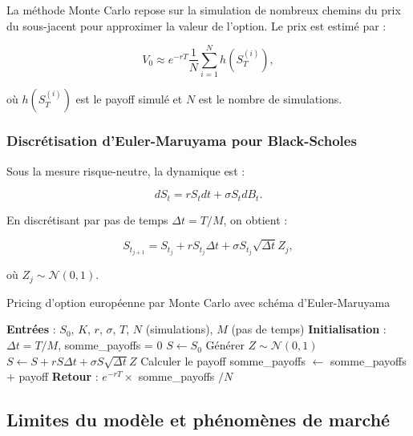 La méthode Monte Carlo repose sur la simulation de nombreux chemins du prix du sous-jacent pour approximer la valeur de l'option. Le prix est estimé par :

\begin{equation}
	V_0 \approx e^{-rT} \frac{1}{N} \sum_{i=1}^{N} h(S_T^{(i)}),
\end{equation}

où $h(S_T^{(i)})$ est le payoff simulé et $N$ est le nombre de simulations.

\subsubsection{Discrétisation d'Euler-Maruyama pour Black-Scholes}

Sous la mesure risque-neutre, la dynamique est :

\begin{equation}
	dS_t = rS_t dt + \sigma S_t dB_t.
\end{equation}

En discrétisant par pas de temps $\Delta t = T/M$, on obtient :

\begin{equation}
	S_{t_{j+1}} = S_{t_j} + rS_{t_j}\Delta t + \sigma S_{t_j}\sqrt{\Delta t} Z_j,
\end{equation}

où $Z_j \sim \mathcal{N}(0,1)$.

\begin{algorithm}[H]
	\caption{Pricing d'option européenne par Monte Carlo avec schéma d'Euler-Maruyama}
	\begin{algorithmic}[1]
		\State \textbf{Entrées} : $S_0$, $K$, $r$, $\sigma$, $T$, $N$ (simulations), $M$ (pas de temps)
		\State \textbf{Initialisation} : $\Delta t = T/M$, somme\_payoffs = 0
		\State $S \gets S_0$
		\State Générer $Z \sim \mathcal{N}(0,1)$
		\State $S \gets S + rS\Delta t + \sigma S\sqrt{\Delta t}Z$
		\EndFor
		\State Calculer le payoff
		\State somme\_payoffs $\gets$ somme\_payoffs + payoff
		\EndFor
		\State \textbf{Retour} : $e^{-rT} \times$ somme\_payoffs $/N$
	\end{algorithmic}
\end{algorithm}

\subsection{Limites du modèle et phénomènes de marché}

